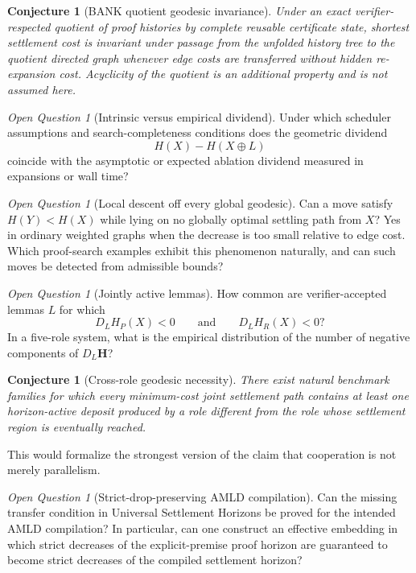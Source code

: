 \documentclass[11pt]{article}
\newtheorem{conjecture}[definition]{Conjecture}
\theoremstyle{remark}
\newtheorem{question}[definition]{Open Question}
\begin{document}
\begin{conjecture}[BANK quotient geodesic invariance]
Under an exact verifier-respected quotient of proof histories by complete reusable certificate state, shortest settlement cost is invariant under passage from the unfolded history tree to the quotient directed graph whenever edge costs are transferred without hidden re-expansion cost. Acyclicity of the quotient is an additional property and is not assumed here.
\end{conjecture}

\begin{question}[Intrinsic versus empirical dividend]
Under which scheduler assumptions and search-completeness conditions does the geometric dividend
\[
H(X)-H(X\oplus L)
\]
coincide with the asymptotic or expected ablation dividend measured in expansions or wall time?
\end{question}

\begin{question}[Local descent off every global geodesic]
Can a move satisfy $H(Y)<H(X)$ while lying on no globally optimal settling path from $X$? Yes in ordinary weighted graphs when the decrease is too small relative to edge cost. Which proof-search examples exhibit this phenomenon naturally, and can such moves be detected from admissible bounds?
\end{question}

\begin{question}[Jointly active lemmas]
How common are verifier-accepted lemmas $L$ for which
\[
D_LH_P(X)<0
\qquad\text{and}\qquad
D_LH_R(X)<0?
\]
In a five-role system, what is the empirical distribution of the number of negative components of $D_L\mathbf H$?
\end{question}

\begin{conjecture}[Cross-role geodesic necessity]
There exist natural benchmark families for which every minimum-cost joint settlement path contains at least one horizon-active deposit produced by a role different from the role whose settlement region is eventually reached.
\end{conjecture}

This would formalize the strongest version of the claim that cooperation is not merely parallelism.

\begin{question}[Strict-drop-preserving AMLD compilation]
Can the missing transfer condition in Universal Settlement Horizons be proved for the intended AMLD compilation? In particular, can one construct an effective embedding in which strict decreases of the explicit-premise proof horizon are guaranteed to become strict decreases of the compiled settlement horizon?
\end{question}
\end{document}
